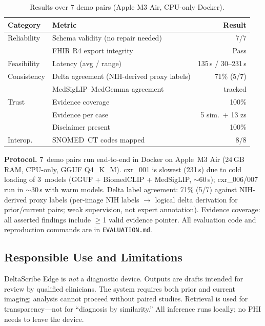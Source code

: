 \documentclass[10pt,twocolumn]{article}
\begin{document}
\begin{table}[h]
\centering
\small
\caption{Results over 7 demo pairs (Apple M3 Air, CPU-only Docker).}
\label{tab:eval}
\begin{tabularx}{\columnwidth}{@{}lXr@{}}
\toprule
\textbf{Category} & \textbf{Metric} & \textbf{Result} \\
\midrule
Reliability & Schema validity (no repair needed) & 7/7 \\
            & FHIR R4 export integrity    & Pass \\
Feasibility & Latency (avg / range)       & 135\,s / 30--231\,s \\
Consistency & Delta agreement (NIH-derived proxy labels) & 71\% (5/7) \\
            & MedSigLIP--MedGemma agreement & tracked \\
Trust       & Evidence coverage            & 100\% \\
            & Evidence per case            & 5 sim.\ + 13 zs \\
            & Disclaimer present           & 100\% \\
Interop.    & SNOMED~CT codes mapped       & 8/8 \\
\bottomrule
\end{tabularx}
\end{table}

\noindent\textbf{Protocol.}
7~demo pairs run end-to-end in Docker on Apple~M3 Air (24\,GB RAM, CPU-only, GGUF Q4\_K\_M).
cxr\_001 is slowest (231\,s) due to cold loading of 3~models (GGUF + BiomedCLIP + MedSigLIP, ${\sim}$60\,s); cxr\_006/007 run in ${\sim}$30\,s with warm models.
Delta label agreement: 71\% (5/7) against NIH-derived proxy labels (per-image NIH labels $\rightarrow$ logical delta derivation for prior/current pairs; weak supervision, not expert annotation).
Evidence coverage: all asserted findings include $\geq$1 valid evidence pointer.
All evaluation code and reproduction commands are in \texttt{EVALUATION.md}.

\subsection{Responsible Use and Limitations}

DeltaScribe Edge is \emph{not} a diagnostic device.
Outputs are drafts intended for review by qualified clinicians.
The system requires both prior and current imaging; analysis cannot proceed without paired studies.
Retrieval is used for transparency---not for ``diagnosis by similarity.''
All inference runs locally; no PHI needs to leave the device.
\end{document}
